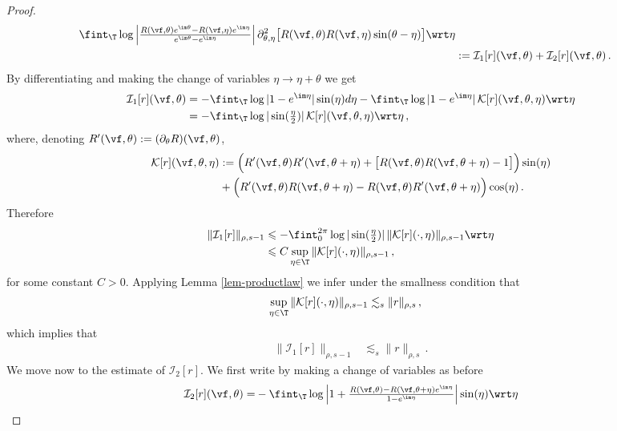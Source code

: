 \documentclass[a4paper,reqno,10pt]{article}
\newcommand{\pa}{\partial}
\begin{document}
\begin{proof}
\begin{equation}
\begin{aligned}
		 \fint_{\T} \log \left| \tfrac{R(\vf,\theta) e^{\im\theta} - R(\vf,\eta) e^{\im\eta}}{e^{\im\theta}-e^{\im\eta}} \right| \pa_{\theta,\eta}^2 \big[ R(\vf,\theta) R(\vf,\eta) \sin(\theta-\eta) \big] \wrt \eta\\
		&:= \mathcal{I}_1[r](\vf,\theta)+ \mathcal{I}_2[r](\vf,\theta)\,.
	\end{aligned}
\end{equation}
    By differentiating and making the change of variables $ \eta\to \eta+\theta$ we get
\begin{align*}
    \mathcal{I}_1[r](\vf,\theta)&=- \fint_{\T} \log |  1 -  e^{\im\eta} |\sin(\eta) d\eta- \fint_{\T} \log |  1 -  e^{\im\eta} |\, \mathcal{K}[r](\vf,\theta,\eta) \wrt \eta\\
    &= -\fint_{\T} \log |  \sin(\tfrac\eta2) |\, \mathcal{K}[r](\vf,\theta,\eta) \wrt \eta \,,
    \end{align*}
    where, denoting $R'(\vf,\theta):= (\pa_{\theta}R)(\vf,\theta)$,
    \begin{align*}
     \mathcal{K}[r](\vf,\theta,\eta)&:=\Big(R^\prime(\vf,\theta)R^\prime(\vf,\theta+\eta)+\big[R(\vf,\theta)R(\vf,\theta+\eta)-1\big]\Big)\sin(\eta)\\
     &+\Big(R^\prime(\vf,\theta)R(\vf,\theta+\eta)-R(\vf,\theta)R^\prime(\vf,\theta+\eta)\Big)\cos(\eta)\,.
    \end{align*}
    Therefore
    \begin{align*}
    \|\mathcal{I}_1[r]\|_{\rho,s-1}&\leqslant  -\fint_{0}^{2\pi}  \log |  \sin(\tfrac\eta2) |\, \|\mathcal{K}[r](\cdot,\eta)\|_{\rho,s-1} \wrt \eta\\
    &\leqslant C \sup_{\eta\in\T}\|\mathcal{K}[r](\cdot,\eta)\|_{\rho,s-1}\,,
    \end{align*}
    for some constant $C>0$.
    Applying Lemma \ref{lem-productlaw} we infer under the smallness condition that
     \begin{align}\label{est-K}
     \sup_{\eta\in\T}\|\mathcal{K}[r](\cdot,\eta)\|_{\rho,s-1}
     & \lesssim_{s} \|r\|_{\rho,s}\,,
    \end{align}
    which implies that
    \begin{align}\label{I1-est}
    \|\mathcal{I}_1[r]\|_{\rho,s-1}&\lesssim_{s} \|r\|_{\rho,s}\,.
    \end{align}
    We move now to the estimate of $\mathcal{I}_2[r]$. We first write by making a change of variables as before
    \begin{align*}
\mathcal{I}_2[r](\vf,\theta)=& -\fint_{\T} \log \left| 1+\tfrac{R(\vf,\theta)  - R(\vf,\theta+\eta) e^{\im\eta}}{1-e^{\im\eta}} \right|  \sin(\eta)\wrt \eta\\

\end{align*}
\end{proof}
\end{document}
